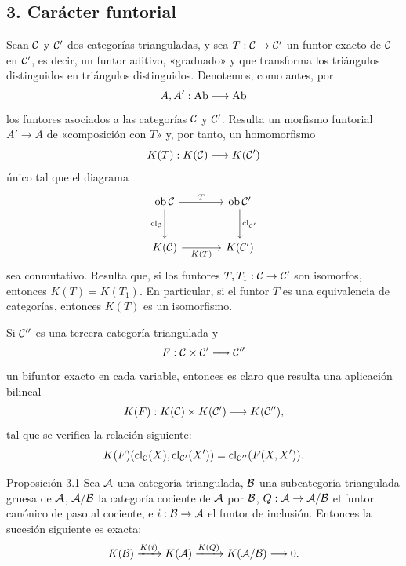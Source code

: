 \subsection*{3. Carácter funtorial}

Sean $\mathcal C$ y $\mathcal C'$ dos categorías trianguladas, y sea $T:\mathcal C\to\mathcal C'$ un funtor exacto de $\mathcal C$ en $\mathcal C'$, es decir, un funtor aditivo, «graduado» y que transforma los triángulos distinguidos en triángulos distinguidos. Denotemos, como antes, por
\[
A,A':\operatorname{Ab}\longrightarrow\operatorname{Ab}
\]
los funtores asociados a las categorías $\mathcal C$ y $\mathcal C'$. Resulta un morfismo funtorial $A'\to A$ de «composición con $T$» y, por tanto, un homomorfismo
\[
K(T):K(\mathcal C)\longrightarrow K(\mathcal C')
\]
único tal que el diagrama
\[
\begin{tikzcd}[column sep=large,row sep=large]
\Ob\cC \arrow[r,"T"] \arrow[d,"\operatorname{cl}_{\cC}"']&
\Ob\cC' \arrow[d,"\operatorname{cl}_{\cC'}"]\\
K(\cC) \arrow[r,"K(T)"']& K(\cC')
\end{tikzcd}
\]
sea conmutativo. Resulta que, si los funtores $T,T_1:\mathcal C\to\mathcal C'$ son isomorfos, entonces $K(T)=K(T_1)$. En particular, si el funtor $T$ es una equivalencia de categorías, entonces $K(T)$ es un isomorfismo.

Si $\mathcal C''$ es una tercera categoría triangulada y
\[
F:\mathcal C\times\mathcal C'\longrightarrow \mathcal C''
\]
un bifuntor exacto en cada variable, entonces es claro que resulta una aplicación bilineal
\[
K(F):K(\mathcal C)\times K(\mathcal C')\longrightarrow K(\mathcal C''),
\]
tal que se verifica la relación siguiente:
\[
K(F)(\operatorname{cl}_{\mathcal C}(X),\operatorname{cl}_{\mathcal C'}(X'))
=
\operatorname{cl}_{\mathcal C''}(F(X,X')).
\]

\begin{statement}{Proposición 3.1}
Sea $\mathcal A$ una categoría triangulada, $\mathcal B$ una subcategoría triangulada gruesa de $\mathcal A$, $\mathcal A/\mathcal B$ la categoría cociente de $\mathcal A$ por $\mathcal B$, $Q:\mathcal A\to\mathcal A/\mathcal B$ el funtor canónico de paso al cociente, e $i:\mathcal B\to\mathcal A$ el funtor de inclusión. Entonces la sucesión siguiente es exacta:
\[
K(\mathcal B)\xrightarrow{K(i)}K(\mathcal A)\xrightarrow{K(Q)}K(\mathcal A/\mathcal B)\longrightarrow 0.
\]
\end{statement}
